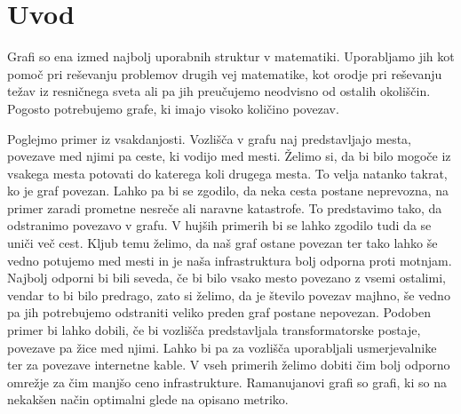 \section{Uvod}
Grafi so ena izmed najbolj uporabnih struktur v matematiki. Uporabljamo jih kot pomoč pri reševanju problemov drugih vej matematike, kot orodje pri reševanju težav iz resničnega sveta ali pa jih preučujemo neodvisno od ostalih okoliščin. Pogosto potrebujemo grafe, ki imajo visoko količino povezav.

Poglejmo primer iz vsakdanjosti. Vozlišča v grafu naj predstavljajo mesta, povezave med njimi pa ceste, ki vodijo med mesti. Želimo si, da bi bilo mogoče iz vsakega mesta potovati do katerega koli drugega mesta. To velja natanko takrat, ko je graf povezan. Lahko pa bi se zgodilo, da neka cesta postane neprevozna, na primer zaradi prometne nesreče ali naravne katastrofe. To predstavimo tako, da odstranimo povezavo v grafu. V hujših primerih bi se lahko zgodilo tudi da se uniči več cest. Kljub temu želimo, da naš graf ostane povezan ter tako lahko še vedno potujemo med mesti in je naša infrastruktura bolj odporna proti motnjam. Najbolj odporni bi bili seveda, če bi bilo vsako mesto povezano z vsemi ostalimi, vendar to bi bilo predrago, zato si želimo, da je število povezav majhno, še vedno pa jih potrebujemo odstraniti veliko preden graf postane nepovezan.
Podoben primer bi lahko dobili, če bi vozlišča predstavljala transformatorske postaje, povezave pa žice med njimi. Lahko bi pa za vozlišča uporabljali usmerjevalnike ter za povezave internetne kable. V vseh primerih želimo dobiti čim bolj odporno omrežje za čim manjšo ceno infrastrukture. Ramanujanovi grafi so grafi, ki so na nekakšen način optimalni glede na opisano metriko.
